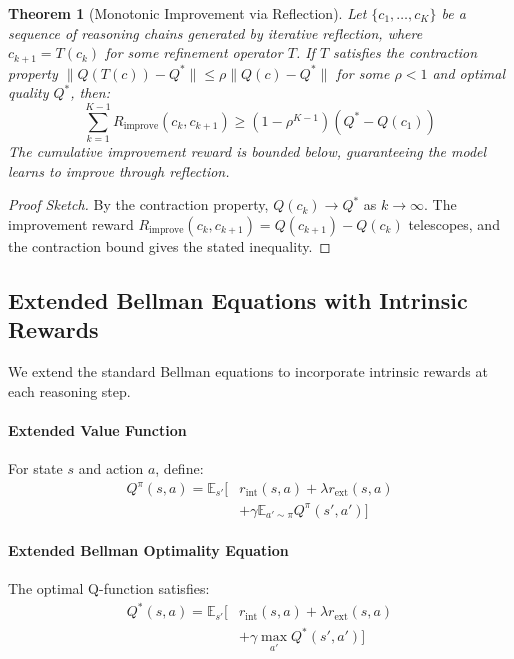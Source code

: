 \documentclass{article}
\theoremstyle{plain}
\newtheorem{theorem}{Theorem}[section]
\theoremstyle{definition}
\theoremstyle{remark}
\begin{document}
\begin{theorem}[Monotonic Improvement via Reflection]
\label{thm:reflection}
Let $\{c_1, \ldots, c_K\}$ be a sequence of reasoning chains generated by iterative reflection, where $c_{k+1} = T(c_k)$ for some refinement operator $T$. If $T$ satisfies the contraction property $\|Q(T(c)) - Q^*\| \leq \rho \|Q(c) - Q^*\|$ for some $\rho < 1$ and optimal quality $Q^*$, then:
\begin{equation}
\sum_{k=1}^{K-1} R_{\text{improve}}(c_k, c_{k+1}) \geq (1 - \rho^{K-1})(Q^* - Q(c_1))
\end{equation}
The cumulative improvement reward is bounded below, guaranteeing the model learns to improve through reflection.
\end{theorem}

\begin{proof}[Proof Sketch]
By the contraction property, $Q(c_k) \to Q^*$ as $k \to \infty$. The improvement reward $R_{\text{improve}}(c_k, c_{k+1}) = Q(c_{k+1}) - Q(c_k)$ telescopes, and the contraction bound gives the stated inequality.
\end{proof}

\subsection{Extended Bellman Equations with Intrinsic Rewards}

We extend the standard Bellman equations to incorporate intrinsic rewards at each reasoning step.

\paragraph{Extended Value Function} For state $s$ and action $a$, define:
\begin{align}
Q^\pi(s, a) = \mathbb{E}_{s'} \big[ & r_{\text{int}}(s, a) + \lambda r_{\text{ext}}(s, a) \nonumber \\
& + \gamma \mathbb{E}_{a' \sim \pi} Q^\pi(s', a') \big]
\end{align}

\paragraph{Extended Bellman Optimality Equation} The optimal Q-function satisfies:
\begin{align}
Q^*(s, a) = \mathbb{E}_{s'} \big[ & r_{\text{int}}(s, a) + \lambda r_{\text{ext}}(s, a) \nonumber \\
& + \gamma \max_{a'} Q^*(s', a') \big]
\end{align}
\end{document}

